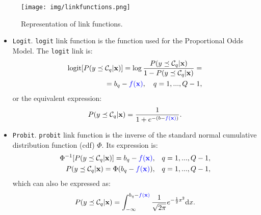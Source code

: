 \documentclass[journal]{IEEEtran}
\begin{document}
	\begin{figure}[!t]
		\centering
		\texttt{[image: img/linkfunctions.png]}
		\caption{Representation of link functions.}
		\label{fig:linkfunctions}
	\end{figure}

	\begin{itemize}
		\item \texttt{Logit}. \texttt{logit} link function is the function used for the Proportional Odds Model. The \texttt{logit} link is:
		\begin{equation}
		\begin{aligned}
		\text{logit}[P(y \preceq \mathcal{C}_q | \mathbf{x})] = \log\frac{P(y \preceq \mathcal{C}_q | \mathbf{x})}{1 - P(y \preceq \mathcal{C}_q | \mathbf{x})}=& \\ = b_q - \textcolor{blue}{f(\mathbf{x})}, \quad q = 1, ..., Q-1,
		\end{aligned}
		\label{eq:logit}
		\end{equation}		
		or the equivalent expression:		
		\begin{equation}
		P(y \preceq \mathcal{C}_q | \mathbf{x}) = \frac{1}{1 + e^{-(b - \textcolor{blue}{f(\mathbf{x})})}}.
		\label{eq:logit2}
		\end{equation}
		
		\item \texttt{Probit}. \texttt{probit} link function is the inverse of the standard normal cumulative distribution function (cdf) $\Phi$. Its expression is:
		\begin{equation}
		\begin{aligned}
		\Phi^{-1}[P(y \preceq \mathcal{C}_q | \mathbf{x})] = b_q - \textcolor{blue}{f(\mathbf{x})}, \quad &q = 1, ..., Q-1,\\
		P(y \preceq \mathcal{C}_q | \mathbf{x}) = \Phi(b_q - \textcolor{blue}{f(\mathbf{x})}), \quad &q = 1, ..., Q-1,
		\end{aligned}
		\label{eq:probit}
		\end{equation}		
		which can also be expressed as:
		\begin{equation}
		P(y \preceq \mathcal{C}_q | \mathbf{x}) = \int_{-\infty}^{b_q - \textcolor{blue}{f(\mathbf{x})}} \frac{1}{\sqrt{2\pi}} e^{-\frac{1}{2}x^2} \mathrm{d}x.
		\label{eq:probit2}
		\end{equation}
		

\end{itemize}
\end{document}
